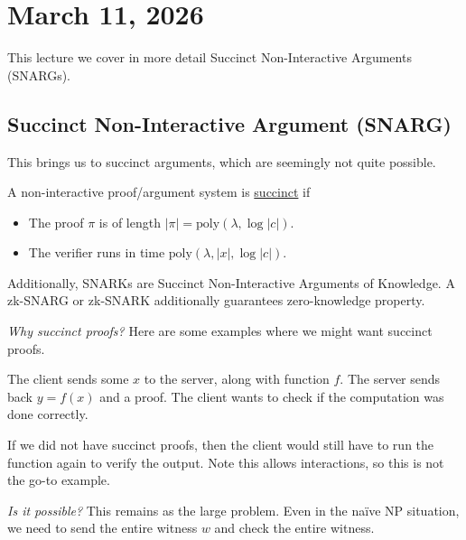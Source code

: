 \section{March 11, 2026}
\label{20260311}

This lecture we cover in more detail Succinct Non-Interactive Arguments (SNARGs).

\subsection{Succinct Non-Interactive Argument (SNARG)}
This brings us to succinct arguments, which are seemingly not quite possible.
\begin{definition}
    A non-interactive proof/argument system is \ul{succinct} if
    \begin{itemize}
        \item The proof $\pi$ is of length $|\pi| = \mathrm{poly}(\lambda, \log |c|)$.
        \item The verifier runs in time $\mathrm{poly}(\lambda, |x|, \log|c|)$.
    \end{itemize}
\end{definition}
Additionally, SNARKs are Succinct Non-Interactive Arguments of Knowledge. A zk-SNARG or zk-SNARK additionally guarantees zero-knowledge property.

\emph{Why succinct proofs?} Here are some examples where we might want succinct proofs.
\begin{example}
    The client sends some $x$ to the server, along with function $f$. The server sends back $y = f(x)$ and a proof. The client wants to check if the computation was done correctly.


    If we did not have succinct proofs, then the client would still have to run the function again to verify the output. Note this allows interactions, so this is not the go-to example.
\end{example}

\emph{Is it possible?} This remains as the large problem. Even in the na\"ive \textsf{NP} situation, we need to send the entire witness $w$ and check the entire witness.

